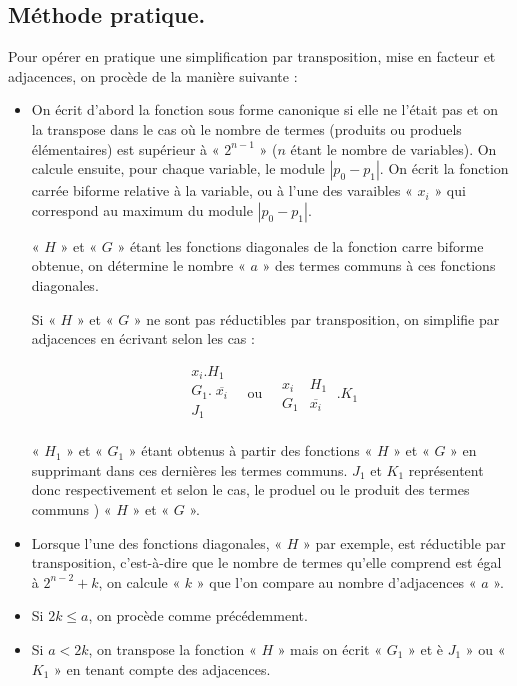\subsection{Méthode pratique.} Pour opérer en pratique une simplification par transposition, mise en facteur et adjacences, on procède de la manière suivante : 

\begin{itemize}
\item On écrit d'abord la fonction sous forme canonique si elle ne l'était pas et on la transpose dans le cas où le nombre de termes (produits ou produels élémentaires) est supérieur à « $2^{n-1}$ » ($n$ étant le nombre de variables). On calcule ensuite, pour chaque variable, le module $|p_0 - p_1|$. On écrit la fonction carrée biforme relative à la variable, ou à l'une des varaibles « $x_i$ » qui correspond au maximum du module $|p_0 - p_1|$.

« $H$ » et « $G$ » étant les fonctions diagonales de la fonction carre biforme obtenue, on détermine le nombre « $a$ » des termes communs à ces fonctions diagonales. 

Si « $H$ » et « $G$ » ne sont pas réductibles par transposition, on simplifie par adjacences en écrivant selon les cas : 

\medskip

\[
\begin{array}{|c|} x_i . H_1 \\ G_1 . \; \overline{x_i} \\ J_1   \\    \end{array} \quad 
      \text{ou} \quad \begin{array}{|c|c|} x_i & H_1 \\ G_1 & \overline{x_i} \end{array} \; . K_1 
\]

\medskip 


« $H_1$ » et « $G_1$ » étant obtenus à partir des fonctions « $H$ » et « $G$ » en supprimant dans ces dernières les termes communs. $J_1$ et $K_1$ représentent donc respectivement et selon le cas, le produel ou le produit des termes communs ) « $H$ » et « $G$ ».

\item Lorsque l'une des fonctions diagonales, « $H$ » par exemple, est réductible par transposition, c'est-à-dire que le nombre de termes qu'elle comprend est égal à $2^{n-2} +k$, on calcule « $k$ » que l'on compare au nombre d'adjacences « $a$ ».

\item Si $2k \leqslant a$, on procède comme précédemment.

\item Si $a < 2k$, on transpose la fonction « $H$ » mais on écrit « $G_1$ » et è $J_1$ » ou « $K_1$ » en tenant compte des adjacences.


\end{itemize} 

